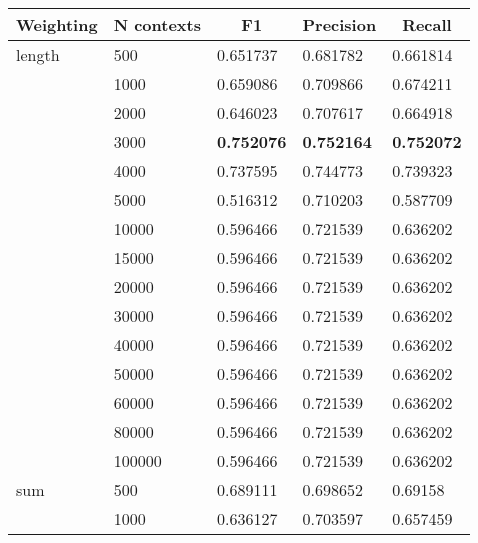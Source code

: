\begin{table}[H]
\centering
\begin{tabular}{lllll}
\toprule
 \multicolumn{1}{c}{Weighting} & \multicolumn{1}{c}{N contexts} & \multicolumn{1}{c}{F1} & \multicolumn{1}{c}{Precision}
 & \multicolumn{1}{c}{Recall} \\
 \midrule
length          & 500               & 0.651737          & 0.681782          & 0.661814          \\
~               & 1000              & 0.659086          & 0.709866          & 0.674211          \\
~               & 2000              & 0.646023          & 0.707617          & 0.664918          \\
~               & 3000              & \textbf{0.752076} & \textbf{0.752164} & \textbf{0.752072} \\
~               & 4000              & 0.737595          & 0.744773          & 0.739323          \\
~               & 5000              & 0.516312          & 0.710203          & 0.587709          \\
~               & 10000             & 0.596466          & 0.721539          & 0.636202          \\
~               & 15000             & 0.596466          & 0.721539          & 0.636202          \\
~               & 20000             & 0.596466          & 0.721539          & 0.636202          \\
~               & 30000             & 0.596466          & 0.721539          & 0.636202          \\
~               & 40000             & 0.596466          & 0.721539          & 0.636202          \\
~               & 50000             & 0.596466          & 0.721539          & 0.636202          \\
~               & 60000             & 0.596466          & 0.721539          & 0.636202          \\
~               & 80000             & 0.596466          & 0.721539          & 0.636202          \\
~               & 100000            & 0.596466          & 0.721539          & 0.636202          \\
sum             & 500               & 0.689111          & 0.698652          & 0.69158           \\
~               & 1000              & 0.636127          & 0.703597          & 0.657459          \\

\end{tabular}
\end{table}
